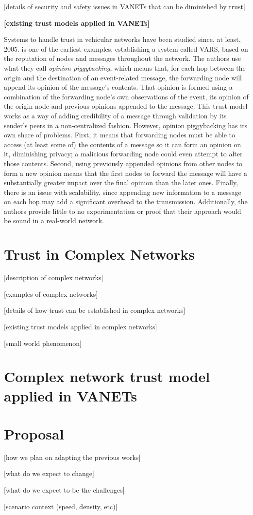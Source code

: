 \documentclass{article}
\begin{document}
[details of security and safety issues in VANETs that can be diminished by trust]

\textbf{[existing trust models applied in VANETs]}

Systems to handle trust in vehicular networks have been studied since, at least, 2005.
\cite{dotzer2005vars} is one of the earliest examples, establishing a system called VARS, based on the reputation of nodes and messages throughout the network.
The authors use what they call \textit{opinion piggybacking}, which means that, for each hop between the origin and the destination of an event-related message, the forwarding node will append its opinion of the message's contents.
That opinion is formed using a combination of the forwarding node's own observations of the event, its opinion of the origin node and previous opinions appended to the message.
This trust model works as a way of adding credibility of a message through validation by its sender's peers in a non-centralized fashion.
However, opinion piggybacking has its own share of problems.
First, it means that forwarding nodes must be able to access (at least some of) the contents of a message so it can form an opinion on it, diminishing privacy; a malicious forwarding node could even attempt to alter those contents.
Second, using previously appended opinions from other nodes to form a new opinion means that the first nodes to forward the message will have a substantially greater impact over the final opinion than the later ones.
Finally, there is an issue with scalability, since appending new information to a message on each hop may add a significant overhead to the transmission. Additionally, the authors provide little to no experimentation or proof that their approach would be sound in a real-world network.

\section{Trust in Complex Networks}
[description of complex networks]

[examples of complex networks]

[details of how trust can be established in complex networks]

[existing trust models applied in complex networks]

[small world phenomenon]

\textbf{\cite{vernize2015malicious}}

\section{Complex network trust model applied in VANETs}


\section{Proposal}

[how we plan on adapting the previous works]

[what do we expect to change]

[what do we expect to be the challenges]

[scenario context (speed, density, etc)]




 
\end{document}
